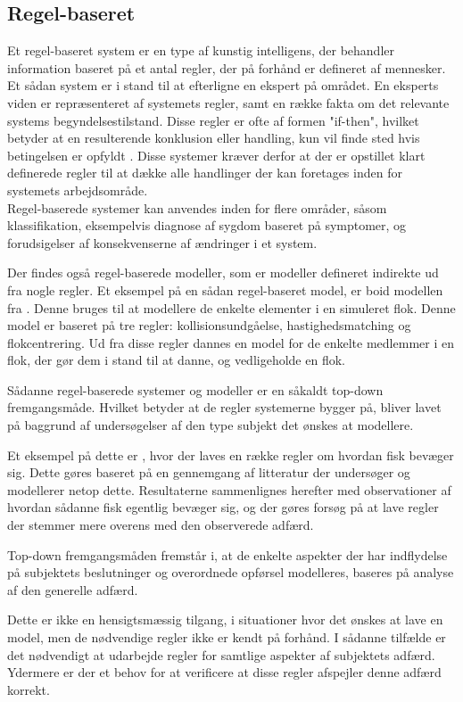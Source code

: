 \subsection{Regel-baseret}
Et regel-baseret system er en type af kunstig intelligens, der behandler information baseret på et antal regler, der på forhånd er defineret af mennesker. Et sådan system er i stand til at efterligne en ekspert på området. En eksperts viden er repræsenteret af systemets regler, samt en række fakta om det relevante systems begyndelsestilstand. Disse regler er ofte af formen "if-then", hvilket betyder at en resulterende konklusion eller handling, kun vil finde sted hvis betingelsen er opfyldt \cite{Grosan2011}. Disse systemer kræver derfor at der er opstillet klart definerede regler til at dække alle handlinger der kan foretages inden for systemets arbejdsområde.\\
Regel-baserede systemer kan anvendes inden for flere områder, såsom klassifikation, eksempelvis diagnose af sygdom baseret på symptomer, og forudsigelser af konsekvenserne af ændringer i et system. 
\par
Der findes også regel-baserede modeller, som er modeller defineret indirekte ud fra nogle regler. Et eksempel på en sådan regel-baseret model, er boid modellen fra \cite{boids}. Denne bruges til at modellere de enkelte elementer i en simuleret flok. Denne model er baseret på tre regler: kollisionsundgåelse, hastighedsmatching og flokcentrering. Ud fra disse regler dannes en model for de enkelte medlemmer i en flok, der gør dem i stand til at danne, og vedligeholde en flok.
\par
Sådanne regel-baserede systemer og modeller er en såkaldt top-down fremgangsmåde. Hvilket betyder at de regler systemerne bygger på, bliver lavet på baggrund af undersøgelser af den type subjekt det ønskes at modellere.
\par
Et eksempel på dette er \cite{RAILSBACK199973}, hvor der laves en række regler om hvordan fisk bevæger sig. Dette gøres baseret på en gennemgang af litteratur der undersøger og modellerer netop dette. Resultaterne sammenlignes herefter med observationer af hvordan sådanne fisk egentlig bevæger sig, og der gøres forsøg på at lave regler der stemmer mere overens med den observerede adfærd.
\par
Top-down fremgangsmåden fremstår i, at de enkelte aspekter der har indflydelse på subjektets beslutninger og overordnede opførsel modelleres, baseres på analyse af den generelle adfærd. 
\par
Dette er ikke en hensigtsmæssig tilgang, i situationer hvor det ønskes at lave en model, men de nødvendige regler ikke er kendt på forhånd. I sådanne tilfælde er det nødvendigt at udarbejde regler for samtlige aspekter af subjektets adfærd. Ydermere er der et behov for at verificere at disse regler afspejler denne adfærd korrekt.

